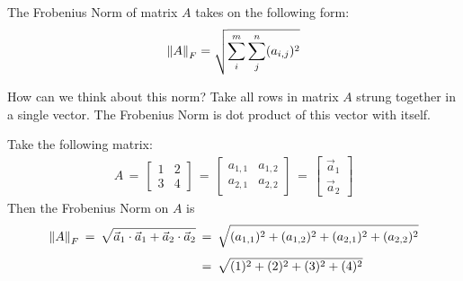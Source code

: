 \begin{tcolorbox}[sharp corners, colback=red!5!white, colframe=black!75!black, fontupper=\color{black}]
\begin{definition}
    The Frobenius Norm of matrix $A$ takes on the following form:
    \begin{align*}
        \left\lVert A\right\rVert_{F} = \sqrt{\sum_{i}^{m}\sum_{j}^{n}(a_{i,j})^{2}}
    \end{align*}
\end{definition}
\end{tcolorbox}

How can we think about this norm? Take all rows in matrix $A$ strung together in a single vector. The Frobenius Norm is dot product of this vector with itself. 

\begin{example} \label{frobenius_example_1}
Take the following matrix:
    \begin{align*}
        A \hspace{2pt} = \hspace{2pt}
        \begin{bmatrix}
            1 & 2\\
            3 & 4
        \end{bmatrix} \hspace{2pt} = \hspace{2pt} 
        \begin{bmatrix}
            a_{1,1} & a_{1,2}\\
            a_{2,1} & a_{2,2}
        \end{bmatrix} \hspace{2pt} = \hspace{2pt} 
        \begin{bmatrix}
            \vec{a}_{1}\\
            \vec{a}_{2}
        \end{bmatrix}
    \end{align*}
Then the Frobenius Norm on $A$ is 
    \begin{align*}
        \left\lVert A\right\rVert_{F} \hspace{2pt} = \hspace{2pt} \sqrt{\vec{a}_{1} \cdot \vec{a}_{1} + \vec{a}_{2} \cdot \vec{a}_{2}} \hspace{2pt} &= \hspace{2pt} \sqrt{(a_{1,1})^{2} + (a_{1,2})^{2} + (a_{2,1})^{2} + (a_{2,2})^{2}}\\[1ex]
        &= \hspace{2pt} \sqrt{(1)^{2} + (2)^{2} + (3)^{2} + (4)^{2}}
    \end{align*}


\end{example}
